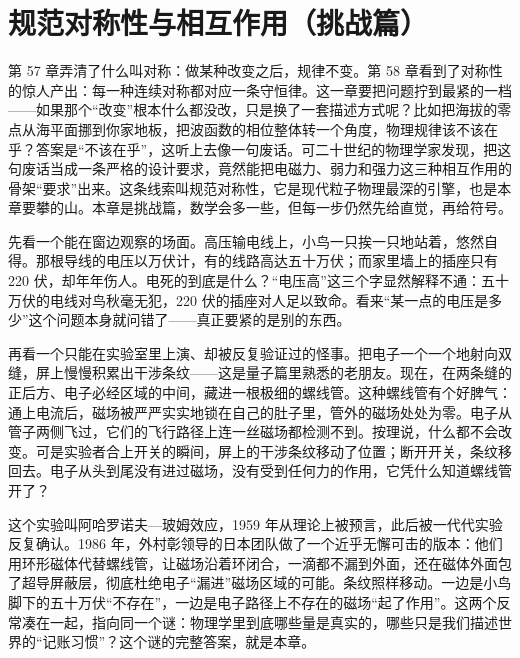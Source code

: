\chapter{规范对称性与相互作用（挑战篇）}

第 57 章弄清了什么叫对称：做某种改变之后，规律不变。第 58 章看到了对称性的惊人产出：每一种连续对称都对应一条守恒律。这一章要把问题拧到最紧的一档——如果那个“改变”根本什么都没改，只是换了一套描述方式呢？比如把海拔的零点从海平面挪到你家地板，把波函数的相位整体转一个角度，物理规律该不该在乎？答案是“不该在乎”，这听上去像一句废话。可二十世纪的物理学家发现，把这句废话当成一条严格的设计要求，竟然能把电磁力、弱力和强力这三种相互作用的骨架“要求”出来。这条线索叫规范对称性，它是现代粒子物理最深的引擎，也是本章要攀的山。本章是挑战篇，数学会多一些，但每一步仍然先给直觉，再给符号。


\begin{mainline}
先看一个能在窗边观察的场面。高压输电线上，小鸟一只挨一只地站着，悠然自得。那根导线的电压以万伏计，有的线路高达五十万伏；而家里墙上的插座只有 220 伏，却年年伤人。电死的到底是什么？“电压高”这三个字显然解释不通：五十万伏的电线对鸟秋毫无犯，220 伏的插座对人足以致命。看来“某一点的电压是多少”这个问题本身就问错了——真正要紧的是别的东西。

再看一个只能在实验室里上演、却被反复验证过的怪事。把电子一个一个地射向双缝，屏上慢慢积累出干涉条纹——这是量子篇里熟悉的老朋友。现在，在两条缝的正后方、电子必经区域的中间，藏进一根极细的螺线管。这种螺线管有个好脾气：通上电流后，磁场被严严实实地锁在自己的肚子里，管外的磁场处处为零。电子从管子两侧飞过，它们的飞行路径上连一丝磁场都检测不到。按理说，什么都不会改变。可是实验者合上开关的瞬间，屏上的干涉条纹移动了位置；断开开关，条纹移回去。电子从头到尾没有进过磁场，没有受到任何力的作用，它凭什么知道螺线管开了？

这个实验叫阿哈罗诺夫—玻姆效应，1959 年从理论上被预言，此后被一代代实验反复确认。1986 年，外村彰领导的日本团队做了一个近乎无懈可击的版本：他们用环形磁体代替螺线管，让磁场沿着环闭合，一滴都不漏到外面，还在磁体外面包了超导屏蔽层，彻底杜绝电子“漏进”磁场区域的可能。条纹照样移动。一边是小鸟脚下的五十万伏“不存在”，一边是电子路径上不存在的磁场“起了作用”。这两个反常凑在一起，指向同一个谜：物理学里到底哪些量是真实的，哪些只是我们描述世界的“记账习惯”？这个谜的完整答案，就是本章。
\end{mainline}


